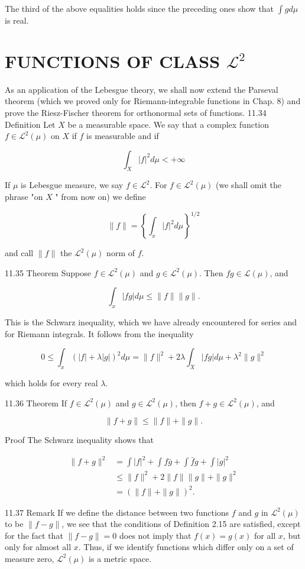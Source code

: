 \documentclass[10pt]{article}
\begin{document}
The third of the above equalities holds since the preceding ones show that $\int g d \mu$ is real.

\section{FUNCTIONS OF CLASS $\mathscr{L}^{2}$}
As an application of the Lebesgue theory, we shall now extend the Parseval theorem (which we proved only for Riemann-integrable functions in Chap. 8) and prove the Riesz-Fischer theorem for orthonormal sets of functions. 11.34 Definition Let $X$ be a measurable space. We say that a complex function $f \in \mathscr{L}^{2}(\mu)$ on $X$ if $f$ is measurable and if

$$
\int_{X}|f|^{2} d \mu<+\infty
$$

If $\mu$ is Lebesgue measure, we say $f \in \mathscr{L}^{2}$. For $f \in \mathscr{L}^{2}(\mu)$ (we shall omit the phrase "on $X$ " from now on) we define

$$
\|f\|=\left\{\int_{x}|f|^{2} d \mu\right\}^{1 / 2}
$$

and call $\|f\|$ the $\mathscr{L}^{2}(\mu)$ norm of $f$.

11.35 Theorem Suppose $f \in \mathscr{L}^{2}(\mu)$ and $g \in \mathscr{L}^{2}(\mu)$. Then $f g \in \mathscr{L}(\mu)$, and

$$
\int_{x}|f g| d \mu \leq\|f\|\|g\| .
$$

This is the Schwarz inequality, which we have already encountered for series and for Riemann integrals. It follows from the inequality

$$
0 \leq \int_{x}(|f|+\lambda|g|)^{2} d \mu=\|f\|^{2}+2 \lambda \int_{X}|f g| d \mu+\lambda^{2}\|g\|^{2}
$$

which holds for every real $\lambda$.

11.36 Theorem If $f \in \mathscr{L}^{2}(\mu)$ and $g \in \mathscr{L}^{2}(\mu)$, then $f+g \in \mathscr{L}^{2}(\mu)$, and

$$
\|f+g\| \leq\|f\|+\|g\| .
$$

Proof The Schwarz inequality shows that

$$
\begin{aligned}
\|f+g\|^{2} & =\int|f|^{2}+\int f \bar{g}+\int \bar{f} g+\int|g|^{2} \\
& \leq\|f\|^{2}+2\|f\|\|g\|+\|g\|^{2} \\
& =(\|f\|+\|g\|)^{2} .
\end{aligned}
$$

11.37 Remark If we define the distance between two functions $f$ and $g$ in $\mathscr{L}^{2}(\mu)$ to be $\|f-g\|$, we see that the conditions of Definition 2.15 are satisfied, except for the fact that $\|f-g\|=0$ does not imply that $f(x)=g(x)$ for all $x$, but only for almost all $x$. Thus, if we identify functions which differ only on a set of measure zero, $\mathscr{L}^{2}(\mu)$ is a metric space.
\end{document}
